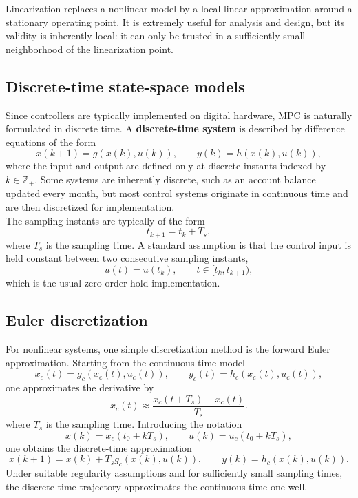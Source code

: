 \begin{theorembox}[Linearization]
Linearization replaces a nonlinear model by a local linear approximation around a stationary operating point. It is extremely useful for analysis and design, but its validity is inherently local: it can only be trusted in a sufficiently small neighborhood of the linearization point.
\end{theorembox}

\subsection{Discrete-time state-space models}

Since controllers are typically implemented on digital hardware, MPC is naturally formulated in discrete time. A \textbf{discrete-time system} is described by difference equations of the form
\[
x(k+1) = g(x(k),u(k)), \qquad y(k) = h(x(k),u(k)),
\]
where the input and output are defined only at discrete instants indexed by $k \in \mathbb{Z}_+$. Some systems are inherently discrete, such as an account balance updated every month, but most control systems originate in continuous time and are then discretized for implementation.\\
The sampling instants are typically of the form
\[
t_{k+1} = t_k + T_s,
\]
where $T_s$ is the sampling time. A standard assumption is that the control input is held constant between two consecutive sampling instants,
\[
u(t)=u(t_k), \qquad t\in [t_k,t_{k+1}),
\]
which is the usual zero-order-hold implementation.

\subsection{Euler discretization}

For nonlinear systems, one simple discretization method is the forward Euler approximation. Starting from the continuous-time model
\[
\dot{x}_c(t)=g_c(x_c(t),u_c(t)), \qquad y_c(t)=h_c(x_c(t),u_c(t)),
\]
one approximates the derivative by
\[
\dot{x}_c(t) \approx \frac{x_c(t+T_s)-x_c(t)}{T_s}.
\]
where $T_s$ is the sampling time. Introducing the notation
\[
x(k)=x_c(t_0+kT_s), \qquad u(k)=u_c(t_0+kT_s),
\]
one obtains the discrete-time approximation
\[
x(k+1)=x(k)+T_s g_c(x(k),u(k)), \qquad y(k)=h_c(x(k),u(k)).
\]
Under suitable regularity assumptions and for sufficiently small sampling times, the discrete-time trajectory approximates the continuous-time one well.\\

